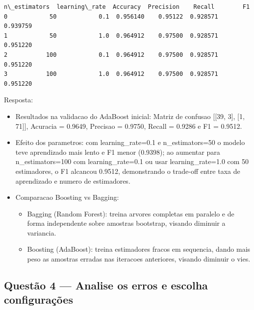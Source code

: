 \documentclass[11pt]{article}
\makeatletter
\providecommand{\tightlist}{%
      \setlength{\itemsep}{0pt}\setlength{\parskip}{0pt}}
\newcommand{\boxspacing}{\kern\kvtcb@left@rule\kern\kvtcb@boxsep}
\newcommand{\prompt}[4]{
        {\ttfamily\llap{{\color{#2}[#3]:\hspace{3pt}#4}}\vspace{-\baselineskip}}
    }
\makeatother
\begin{document}
            \begin{tcolorbox}[breakable, size=fbox, boxrule=.5pt, pad at break*=1mm, opacityfill=0]
\prompt{Out}{outcolor}{3}{\boxspacing}
\begin{Verbatim}[commandchars=\\\{\}]
   n\_estimators  learning\_rate  Accuracy  Precision    Recall        F1
0            50            0.1  0.956140    0.95122  0.928571  0.939759
1            50            1.0  0.964912    0.97500  0.928571  0.951220
2           100            0.1  0.964912    0.97500  0.928571  0.951220
3           100            1.0  0.964912    0.97500  0.928571  0.951220
\end{Verbatim}
\end{tcolorbox}
        
    Resposta:

\begin{itemize}
\tightlist
\item
  Resultados na validacao do AdaBoost inicial: Matriz de confusao
  {[}{[}39, 3{]}, {[}1, 71{]}{]}, Acuracia = 0.9649, Precisao = 0.9750,
  Recall = 0.9286 e F1 = 0.9512.
\item
  Efeito dos parametros: com learning\_rate=0.1 e n\_estimators=50 o
  modelo teve aprendizado mais lento e F1 menor (0.9398); ao aumentar
  para n\_estimators=100 com learning\_rate=0.1 ou usar
  learning\_rate=1.0 com 50 estimadores, o F1 alcancou 0.9512,
  demonstrando o trade-off entre taxa de aprendizado e numero de
  estimadores.
\item
  Comparacao Boosting vs Bagging:

  \begin{itemize}
  \tightlist
  \item
    Bagging (Random Forest): treina arvores completas em paralelo e de
    forma independente sobre amostras bootstrap, visando diminuir a
    variancia.
  \item
    Boosting (AdaBoost): treina estimadores fracos em sequencia, dando
    mais peso as amostras erradas nas iteracoes anteriores, visando
    diminuir o vies.
  \end{itemize}
\end{itemize}

    \subsection{Questão 4 --- Analise os erros e escolha
configurações}\label{questuxe3o-4-analise-os-erros-e-escolha-configurauxe7uxf5es}
\end{document}
